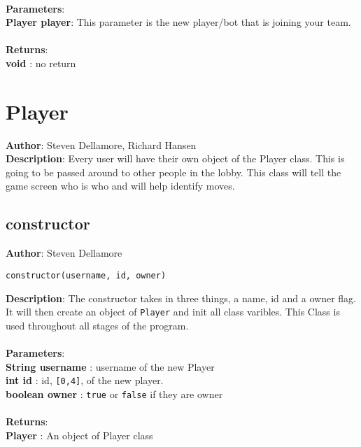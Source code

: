 \documentclass[12pt]{article}
\begin{document}
\textbf{\large{\\Parameters}}:\\
\textbf{Player player}: This parameter is the new player/bot that is joining your team.\\\textbf{\large{\\Returns}}:\\\textbf{void }: no return

\section{Player}
\textbf{Author}: Steven Dellamore, Richard Hansen \\
\textbf{Description}: Every user will have their own object of the Player class. This is going to be passed around to other people in the lobby. This class will tell the game screen who is who and will help identify moves. \\



\subsection{constructor}
\textbf{Author}: Steven Dellamore 
\vspace*{1\baselineskip}
\begin{lstlisting}
constructor(username, id, owner)
\end{lstlisting} 
\vspace*{1\baselineskip}
\textbf{Description}: The constructor takes in three things, a name, id and a owner flag. It will then create an object of \texttt{Player} and init all class varibles. This Class is used throughout all stages of the program. \\


\textbf{\large{\\Parameters}}:\\
\textbf{String username }: username of the new Player\\
\textbf{int id }: id, \texttt{[0,4]}, of the new player.\\
\textbf{boolean owner }: \texttt{true} or \texttt{false} if they are owner\\\textbf{\large{\\Returns}}:\\\textbf{Player }: An object of Player class
\end{document}
